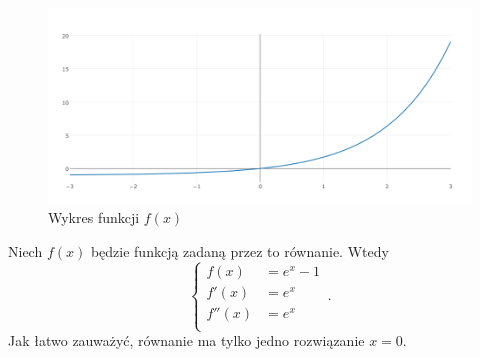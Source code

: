 \documentclass{article}
\begin{document}
    \begin{figure}
      \includegraphics[width=\linewidth]{fplot.png}
      \caption{Wykres funkcji $f(x)$}
      \label{fig:fplot}
    \end{figure}

    Niech $f(x)$ będzie funkcją zadaną przez to równanie. Wtedy
    \begin{equation*}
      \begin{cases}
        f(x)   &= e^{x} - 1 \\
        f'(x)  &= e^{x}     \\
        f''(x) &= e^{x}     \\
      \end{cases}\,.
    \end{equation*}
    Jak łatwo zauważyć, równanie ma tylko jedno rozwiązanie $x = 0$.
\end{document}
